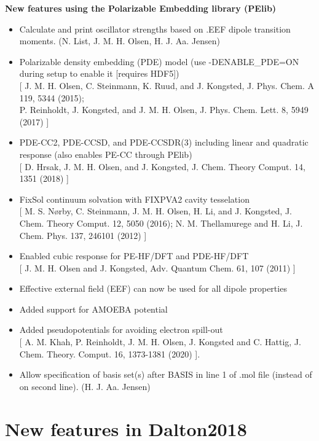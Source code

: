 \begin{description}
\item{\bf  New features using the Polarizable Embedding library (PElib)}
   \begin{itemize}
  \item Calculate and print oscillator strengths based on .EEF dipole transition moments. (N. List, J. M. H. Olsen, H. J. Aa. Jensen)
  \item Polarizable density embedding (PDE) model (use -DENABLE\_PDE=ON during setup to enable it [requires HDF5]) \\ {}
    [ J. M. H. Olsen, C. Steinmann, K. Ruud, and J. Kongsted, J. Phys. Chem. A 119, 5344 (2015); \\
      P. Reinholdt, J. Kongsted, and J. M. H. Olsen, J. Phys. Chem. Lett. 8, 5949 (2017) ]
  \item PDE-CC2, PDE-CCSD, and PDE-CCSDR(3) including linear and quadratic response (also enables PE-CC through PElib) \\ {}
    [ D. Hrsak, J. M. H. Olsen, and J. Kongsted, J. Chem. Theory Comput. 14, 1351 (2018) ]
  \item FixSol continuum solvation with FIXPVA2 cavity tesselation \\ {}
    [ M. S. Nørby, C. Steinmann, J. M. H. Olsen, H. Li, and J. Kongsted, J. Chem. Theory Comput. 12, 5050 (2016);
      N. M. Thellamurege and H. Li, J. Chem. Phys. 137, 246101 (2012) ]
  \item Enabled cubic response for PE-HF/DFT and PDE-HF/DFT \\ {}
    [ J. M. H. Olsen and J. Kongsted, Adv. Quantum Chem. 61, 107 (2011) ]
  \item Effective external field (EEF) can now be used for all dipole properties
  \item Added support for AMOEBA potential
  \item Added pseudopotentials for avoiding electron spill-out \\ {}
    [ A. M. Khah, P. Reinholdt, J. M. H. Olsen, J. Kongsted and C. Hattig, J. Chem. Theory. Comput. 16, 1373-1381 (2020) ].
  \item  Allow specification of basis set(s) after BASIS in line 1 of .mol file (instead of on second line). (H. J. Aa. Jensen)
   \end{itemize}
\end{description}

\section{New features in Dalton2018}

